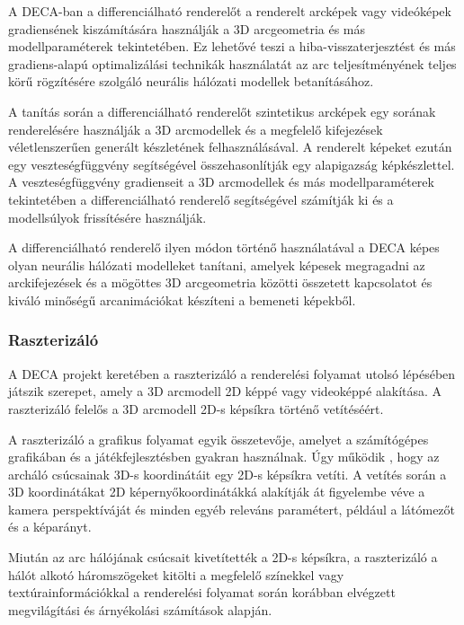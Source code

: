 \documentclass[12pt,a4]{article}
\begin{document}
                A DECA-ban a differenciálható renderelőt a renderelt arcképek vagy videóképek gradiensének kiszámítására használják a 3D arcgeometria és más modellparaméterek tekintetében. Ez lehetővé teszi a hiba-visszaterjesztést és más gradiens-alapú optimalizálási technikák használatát az arc teljesítményének teljes körű rögzítésére szolgáló neurális hálózati modellek betanításához.

                A tanítás során a differenciálható renderelőt szintetikus arcképek egy sorának renderelésére használják a 3D arcmodellek és a megfelelő kifejezések véletlenszerűen generált készletének felhasználásával. A renderelt képeket ezután egy veszteségfüggvény segítségével összehasonlítják egy alapigazság képkészlettel. A veszteségfüggvény gradienseit a 3D arcmodellek és más modellparaméterek tekintetében a differenciálható renderelő segítségével számítják ki és a modellsúlyok frissítésére használják.
                
                A differenciálható renderelő ilyen módon történő használatával a DECA képes olyan neurális hálózati modelleket tanítani, amelyek képesek megragadni az arckifejezések és a mögöttes 3D arcgeometria közötti összetett kapcsolatot és kiváló minőségű arcanimációkat készíteni a bemeneti képekből.

            \subsubsection{Raszterizáló}

                A DECA projekt keretében a raszterizáló a renderelési folyamat utolsó lépésében játszik szerepet, amely a 3D arcmodell 2D képpé vagy videoképpé alakítása. A raszterizáló felelős a 3D arcmodell 2D-s képsíkra történő vetítéséért.

                A raszterizáló a grafikus folyamat egyik összetevője, amelyet a számítógépes grafikában és a játékfejlesztésben gyakran használnak. Úgy működik \cite{standard-rasterizer}, hogy az archáló csúcsainak 3D-s koordinátáit egy 2D-s képsíkra vetíti. A vetítés során a 3D koordinátákat 2D képernyőkoordinátákká alakítják át figyelembe véve a kamera perspektíváját és minden egyéb releváns paramétert, például a látómezőt és a képarányt.
                
                Miután az arc hálójának csúcsait kivetítették a 2D-s képsíkra, a raszterizáló a hálót alkotó háromszögeket kitölti a megfelelő színekkel vagy textúrainformációkkal a renderelési folyamat során korábban elvégzett megvilágítási és árnyékolási számítások alapján.
                
\end{document}
